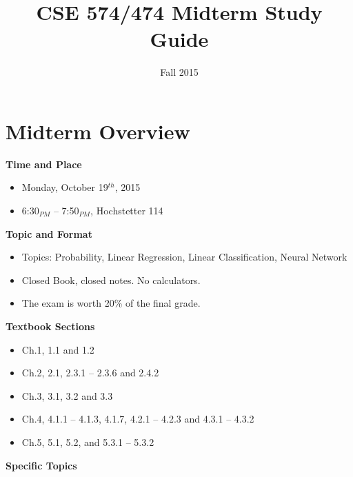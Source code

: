 \documentclass[11pt]{article} %
\title{CSE 574/474 Midterm Study Guide \vspace{-6ex}}
\date{Fall 2015}
\begin{document}
\maketitle

\tableofcontents

\newpage

\section{Midterm Overview}

{\bf Time and Place}
\begin{itemize}
\itemsep -2pt
\item Monday, October 19$^{th}$, 2015 
\item 6:30$_{PM}$ -- 7:50$_{PM}$, Hochstetter 114 
\end{itemize}
{\bf Topic and Format}
\begin{itemize}
\itemsep -2pt
\item Topics: Probability, Linear Regression, Linear Classification, Neural Network
\item Closed Book, closed notes. No calculators.
\item The exam is worth 20\% of the final grade.
\end{itemize}
{\bf Textbook Sections}
\begin{itemize}
\itemsep -2pt
\item Ch.1, 1.1 and 1.2
\item Ch.2, 2.1, 2.3.1 -- 2.3.6 and 2.4.2
\item Ch.3, 3.1, 3.2 and 3.3
\item Ch.4, 4.1.1 -- 4.1.3, 4.1.7, 4.2.1 -- 4.2.3 and 4.3.1 -- 4.3.2
\item Ch.5, 5.1, 5.2, and 5.3.1 -- 5.3.2
\end{itemize}
{\bf Specific Topics}
\end{document}
